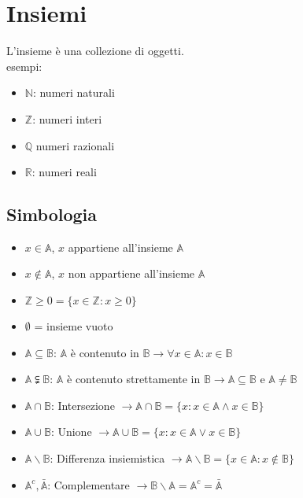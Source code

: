 \documentclass{subfiles}
\begin{document}
\section{Insiemi}

L'insieme è una collezione di oggetti.\\

\noindent
esempi:

\begin{itemize}
    \item $\mathbb{N}$: numeri naturali
    \item $\mathbb{Z}$: numeri interi
    \item $\mathbb{Q}$ numeri razionali
    \item $\mathbb{R}$: numeri reali
\end{itemize}

\subsection{Simbologia}

\begin{itemize}
    \item $x \in \mathbb{A}$, $x$ appartiene all'insieme $\mathbb{A}$
    \item $x \notin \mathbb{A}$, $x$ non appartiene all'insieme $\mathbb{A}$
    \item $\mathbb{Z} \geq 0 = \{ x \in \mathbb{Z} : x \geq 0 \}$
    \item $\emptyset$ = insieme vuoto
    \item $\mathbb{A} \subseteq \mathbb{B}$: $\mathbb{A}$ è contenuto in $\mathbb{B} \longrightarrow \forall x \in \mathbb{A} : x \in \mathbb{B}$
    \item $\mathbb{A} \subsetneqq \mathbb{B}$: $\mathbb{A}$ è contenuto strettamente in $\mathbb{B} \longrightarrow \mathbb{A} \subseteq \mathbb{B}$ e $\mathbb{A} \neq \mathbb{B}$
    \item $\mathbb{A} \cap \mathbb{B}$: Intersezione $\longrightarrow \mathbb{A} \cap \mathbb{B} = \{ x : x \in \mathbb{A} \wedge x \in \mathbb{B} \}$
    \item $\mathbb{A} \cup \mathbb{B}$: Unione $\longrightarrow \mathbb{A} \cup \mathbb{B} = \{ x : x \in \mathbb{A} \vee x \in \mathbb{B} \}$
    \item $\mathbb{A} \backslash \mathbb{B}$: Differenza insiemistica $\longrightarrow \mathbb{A} \backslash \mathbb{B} = \{ x \in \mathbb{A} : x \notin \mathbb{B} \}$
    \item $\mathbb{A}^c, \bar{\mathbb{A}}$: Complementare $\longrightarrow \mathbb{B} \backslash \mathbb{A} = \mathbb{A}^c = \bar{\mathbb{A}}$
\end{itemize}
\end{document}
